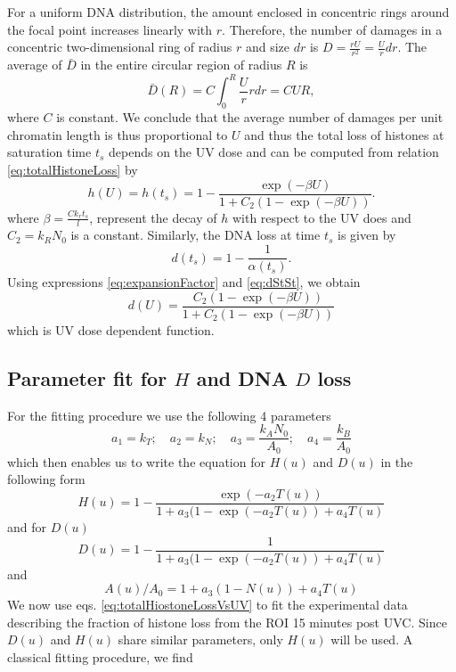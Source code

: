 \documentclass[12pt]{article}
\begin{document}
For a uniform DNA distribution, the amount enclosed in concentric rings around the focal point increases linearly with $r$. Therefore, the number of damages in a concentric two-dimensional ring of radius $r$ and size $dr$ is ${D}= \frac{rU}{r^2}=\frac{U}{r}dr$. The average of $\bar{D}$ in the entire circular region of radius $R$ is
\begin{equation*}
\bar{D}(R) = C\int_0^R \frac{U}{r} rdr = CUR,
\end{equation*}
where $C$ is constant. We conclude that the average number of damages per unit chromatin length is thus proportional to $U$ and thus the total loss of histones at saturation time $t_{s}$ depends on the UV dose and can be computed from relation \ref{eq:totalHistoneLoss} by
\begin{equation}\label{eq:totalHiostoneLossVsUV}
h(U)=h(t_s)=1-\frac{\exp(-\beta U)}{ 1+C_2(1-\exp(-\beta U))}.
\end{equation}
where $\beta=\frac{Ck_rt_s}{l}$, represent the decay of $h$ with respect to the UV does and $C_2=k_RN_0$ is a constant. Similarly, the DNA loss at time $t_{s}$ is given by
\begin{equation}\label{eq:dStSt}
d(t_s)= 1-\frac{1}{\alpha(t_s)}.
\end{equation}
Using expressions \ref{eq:expansionFactor} and \ref{eq:dStSt}, we obtain
\begin{equation}\label{eq:dnaLoss}
d(U)= \frac{C_2(1-\exp(-\beta U))}{1+C_2(1-\exp(-\beta U))}
\end{equation}
which is UV dose dependent function.


\subsection{Parameter fit for $H$ and DNA $D$ loss}\label{subsection:parameterFit}

For the fitting procedure we use the following 4 parameters
\begin{equation}
a_1 = k_T; \quad a_2=k_N; \quad a_3= \frac{k_AN_0}{A_0};\quad a_4 = \frac{k_B}{A_0}
\end{equation}
which then enables us to write the equation for $H(u)$ and $D(u)$ in the following form 
\begin{equation}
H(u)=1-\frac{\exp(-a_2T(u))}{1+a_3(1-\exp(-a_2T(u))+a_4T(u)}
\end{equation}
and for $D(u)$
\begin{equation}
D(u) = 1-\frac{1}{1+a_3(1-\exp(-a_2T(u))+a_4T(u)}
\end{equation}
and 
\begin{equation}
A(u)/A_0 = 1+a_3(1-N(u))+a_4T(u)
\end{equation}
We now use eqs. \ref{eq:totalHiostoneLossVsUV} to fit the experimental data describing the fraction of histone loss from the ROI 15 minutes post UVC. Since $D(u)$ and $H(u)$ share similar parameters, only $H(u)$ will be used. A classical fitting procedure, we find
\end{document}
